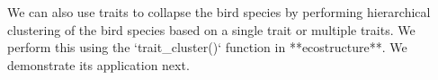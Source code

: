 \documentclass[12pt]{article}
\begin{document}
\begin{knitrout}
\color{fgcolor}\begin{kframe}
\begin{alltt}
 \hlkwb{<-} 
         \hlopt{$}
             \hlstd{=} \hlstd{(} \hlstd{=} \hlstd{,} \hlstd{=}\hlstd{,} \hlstd{=}\hlstd{))}
\end{alltt}
\end{kframe}
\end{knitrout}

\begin{knitrout}
\color{fgcolor}\begin{kframe}
\begin{alltt}
\hlstd{(func_counts[,}\hlopt{:}\hlstd{])}
\end{alltt}
\end{kframe}
\end{knitrout}


We can also use traits to collapse the bird species by performing hierarchical clustering of the bird species based on a single trait or multiple traits. We perform this using the `trait_cluster()` function in **ecostructure**. We demonstrate its application next.
\end{document}
